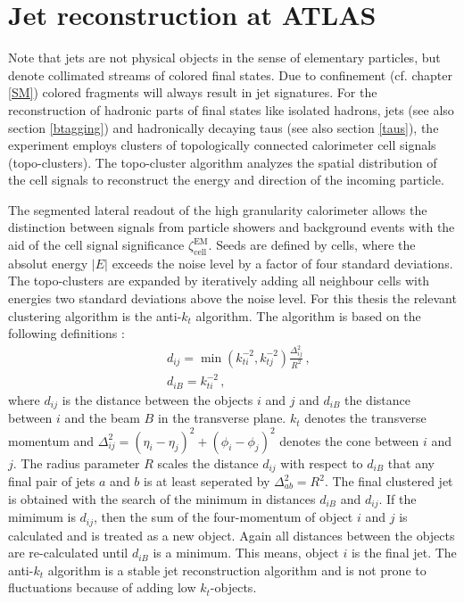 \section{Jet reconstruction at ATLAS}\label{jets}
Note that jets are not physical objects in the sense of elementary particles, but denote collimated streams of colored final states. Due to confinement (cf. chapter \ref{SM}) colored fragments will always result in jet signatures. \cite{PhysTeV}\newline  
For the reconstruction of hadronic parts of final states like isolated hadrons, jets (see also section \ref{btagging}) and hadronically decaying taus (see also section \ref{taus}), the {\ATLAS} experiment employs clusters of topologically connected calorimeter cell signals (topo-clusters). The topo-cluster algorithm analyzes the spatial distribution of the cell signals to reconstruct the energy and direction of the incoming particle. \cite{topo}\par
The segmented lateral readout of the high granularity calorimeter allows the distinction between signals from particle showers and background events with the aid of the cell signal significance $\zeta_\text{cell}^\text{EM}$. \cite{topo} Seeds are defined by cells, where the absolut energy $|E|$ exceeds the noise level by a factor of four standard deviations. The topo-clusters are expanded by iteratively adding all neighbour cells with energies two standard deviations above the noise level. \cite{jetPerformance}\newline
For this thesis the relevant clustering algorithm is the anti-$k_t$ algorithm. The algorithm is based on the following definitions \cite{antikt}:
\begin{align}
                        &d_{ij}=\min(k_{ti}^{-2},k_{tj}^{-2})\frac{\Delta_{ij}^2}{R^2}\,\text{,}\\
                        &d_{iB}=k_{ti}^{-2}\,\text{,}
\label{antiktalgorithm}
\end{align}
where $d_{ij}$ is the distance between the objects $i$ and $j$ and $d_{iB}$ the distance between $i$ and the beam $B$ in the transverse plane. $k_t$ denotes the transverse momentum and $\Delta_{ij}^2=(\eta_i-\eta_j)^2+(\phi_i-\phi_j)^2$ denotes the cone between $i$ and $j$. The radius parameter $R$ scales the distance $d_{ij}$ with respect to $d_{iB}$ that any final pair of jets $a$ and $b$ is at least seperated by $\Delta^2_{ab}=R^2$. The final clustered jet is obtained with the search of the minimum in distances $d_{iB}$ and $d_{ij}$. If the mimimum is $d_{ij}$, then the sum of the four-momentum of object $i$ and $j$ is calculated and is treated as a new object. Again all distances between the objects are re-calculated until $d_{iB}$ is a minimum. This means, object $i$ is the final jet. The anti-$k_t$ algorithm is a stable jet reconstruction algorithm and is not prone to fluctuations because of adding low $k_t$-objects. \cite{antikt}
%
%
